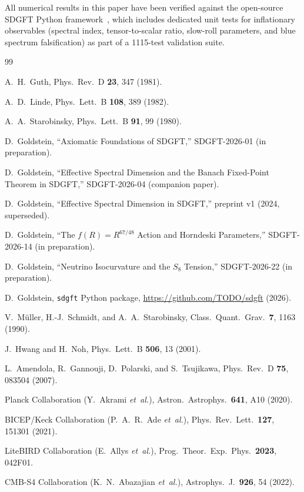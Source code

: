 \documentclass[a4paper,11pt]{article}
\begin{document}
\begin{acknowledgments}
All numerical results in this paper have been verified against the
open-source SDGFT Python framework~\cite{Goldstein_Code}, which
includes dedicated unit tests for inflationary observables (spectral
index, tensor-to-scalar ratio, slow-roll parameters, and blue
spectrum falsification) as part of a 1115-test validation suite.
\end{acknowledgments}



\begin{thebibliography}{99}

A.~H.~Guth,
Phys.\ Rev.\ D \textbf{23}, 347 (1981).

A.~D.~Linde,
Phys.\ Lett.\ B \textbf{108}, 389 (1982).

A.~A.~Starobinsky,
Phys.\ Lett.\ B \textbf{91}, 99 (1980).

D.~Goldstein, ``Axiomatic Foundations of SDGFT,''
SDGFT-2026-01 (in preparation).

D.~Goldstein, ``Effective Spectral Dimension and the Banach
Fixed-Point Theorem in SDGFT,''
SDGFT-2026-04 (companion paper).

D.~Goldstein, ``Effective Spectral Dimension in SDGFT,''
preprint v1 (2024, superseded).

D.~Goldstein, ``The $f(R) = R^{67/48}$ Action and Horndeski
Parameters,'' SDGFT-2026-14 (in preparation).

D.~Goldstein, ``Neutrino Isocurvature and the $S_8$ Tension,''
SDGFT-2026-22 (in preparation).

D.~Goldstein, \texttt{sdgft} Python package,
\url{https://github.com/TODO/sdgft} (2026).

V.~M{\"u}ller, H.-J.~Schmidt, and A.~A.~Starobinsky,
Class.\ Quant.\ Grav.\ \textbf{7}, 1163 (1990).

J.~Hwang and H.~Noh,
Phys.\ Lett.\ B \textbf{506}, 13 (2001).

L.~Amendola, R.~Gannouji, D.~Polarski, and S.~Tsujikawa,
Phys.\ Rev.\ D \textbf{75}, 083504 (2007).

Planck Collaboration (Y.~Akrami \textit{et~al.}),
Astron.\ Astrophys.\ \textbf{641}, A10 (2020).

BICEP/Keck Collaboration (P.~A.~R.~Ade \textit{et~al.}),
Phys.\ Rev.\ Lett.\ \textbf{127}, 151301 (2021).

LiteBIRD Collaboration (E.~Allys \textit{et~al.}),
Prog.\ Theor.\ Exp.\ Phys.\ \textbf{2023}, 042F01.

CMB-S4 Collaboration (K.~N.~Abazajian \textit{et~al.}),
Astrophys.\ J.\ \textbf{926}, 54 (2022).

\end{thebibliography}
\end{document}
